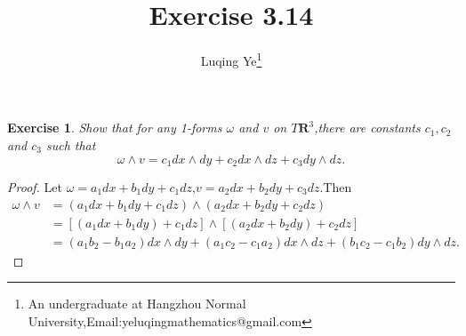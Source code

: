 \documentclass{article}
\newtheorem*{exe}{Exercise}
\newenvironment{exercise}
{\bigskip\begin{mdframed}\begin{exe}}
    {\end{exe}\end{mdframed}\bigskip}
\begin{document}
\title{Exercise 3.14}\author{Luqing Ye\footnote{An undergraduate at Hangzhou Normal University,Email:yeluqingmathematics@gmail.com}}
\maketitle\noindent
\begin{exercise}
  Show that for any 1-forms $\omega$ and $v$ on $T\mathbf{R}^3$,there
  are constants $c_1,c_2$ and $c_3$ such that 
$$
\omega \wedge v=c_1dx\wedge dy+c_2dx\wedge dz+c_3dy\wedge dz.
$$
\end{exercise}
\begin{proof}
Let $\omega=a_1dx+b_1dy+c_1dz$,$v=a_2dx+b_2dy+c_3dz$.Then 
\begin{align*}
\omega\wedge v&=(a_1dx+b_1dy+c_1dz)\wedge
(a_2dx+b_2dy+c_2dz)\\&=[(a_{1}dx+b_{1}dy)+c_{1}dz]\wedge [(a_2dx+b_2dy)+c_2dz]\\&=(a_1b_2-b_{1}a_{2})dx\wedge
dy+(a_1c_2-c_{1}a_{2})dx\wedge dz+(b_{1}c_{2}-c_{1}b_{2})dy\wedge dz.
\end{align*}
\end{proof}






% 
% 
\end{document}
